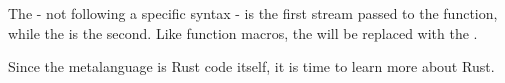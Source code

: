 
The  - not following a specific syntax - is the first stream passed to the function, while the  is the second.
Like function macros, the  will be replaced with the .

Since the metalanguage is Rust code itself, it is time to learn more about Rust.


